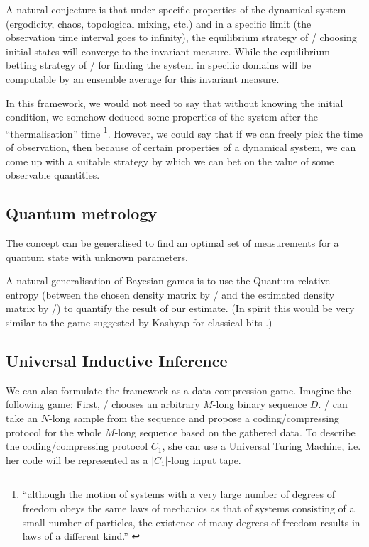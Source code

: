 \documentclass{article}
\theoremstyle{definition}
\begin{document}
A natural conjecture is that under specific properties of the dynamical system (ergodicity, chaos, topological mixing, etc.) and in a specific limit (the observation time interval goes to infinity), the equilibrium strategy of \PII/ choosing initial states will converge to the invariant measure.
While the equilibrium betting strategy of \PI/ for finding the system in specific domains will be computable by an ensemble average for this invariant measure.

In this framework, we would not need to say that without knowing the initial condition, we somehow deduced some properties of the system after the ``thermalisation'' time \footnote{``although the motion of systems with a very large number of
degrees of freedom obeys the same laws of mechanics as that of systems consisting of a small number of particles, the existence of many degrees of freedom results in laws of a different kind.'' \cite{book:Landau}}. However, we could say that if we can freely pick the time of observation, then because of certain properties of a dynamical system, we can come up with a suitable strategy by which we can bet on the value of some observable quantities.



\subsection{Quantum metrology}

The concept can be generalised to find an optimal set of measurements for a quantum state with unknown parameters.

A natural generalisation of Bayesian games is to use the Quantum relative entropy \cite{book:QuantumComputationAndInformation,book:NeumannQuantum} (between the chosen density matrix by \PII/ and the estimated density matrix by \PI/) to quantify the result of our estimate.
(In spirit this would be very similar to the game suggested by Kashyap for classical bits \cite{Kashyap1971,Kashyap1974}.)

\subsection{Universal Inductive Inference}
\label{sec:Solomonoff}

We can also formulate the framework as a data compression game.
Imagine the following game:
First, \PII/ chooses an arbitrary $M$-long binary sequence $D$.
\PI/ can take an $N$-long sample from the sequence
and propose a coding/compressing protocol for the whole $M$-long sequence based on the gathered data.
To describe the coding/compressing protocol $C_1$, she can use a  Universal Turing Machine, i.e. her code will be represented as a $|C_1|$-long input tape.
\end{document}
